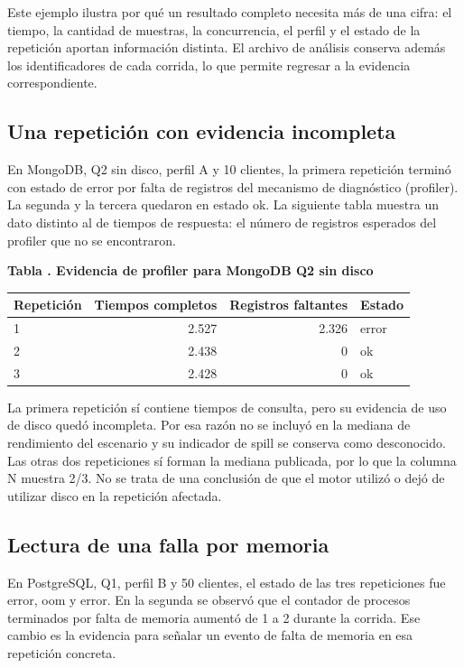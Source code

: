 \documentclass[12pt,letterpaper]{article}
\begin{document}
Este ejemplo ilustra por qué un resultado completo necesita más de una cifra: el tiempo, la cantidad de muestras, la concurrencia, el perfil y el estado de la repetición aportan información distinta. El archivo de análisis conserva además los identificadores de cada corrida, lo que permite regresar a la evidencia correspondiente.

\subsection*{Una repetición con evidencia incompleta}
En MongoDB, Q2 sin disco, perfil A y 10 clientes, la primera repetición terminó con estado de error por falta de registros del mecanismo de diagnóstico (profiler). La segunda y la tercera quedaron en estado ok. La siguiente tabla muestra un dato distinto al de tiempos de respuesta: el número de registros esperados del profiler que no se encontraron.

\par\begin{minipage}{\textwidth}\begin{center}\textbf{Tabla \thetable. Evidencia de profiler para MongoDB Q2 sin disco}\par\small
\begin{tabular}{lrrl}\toprule Repetición & Tiempos completos & Registros faltantes & Estado \\ \midrule
1 & 2.527 & 2.326 & error \\
2 & 2.438 & 0 & ok \\
3 & 2.428 & 0 & ok \\
\bottomrule\end{tabular}\end{center}\end{minipage}\par

La primera repetición sí contiene tiempos de consulta, pero su evidencia de uso de disco quedó incompleta. Por esa razón no se incluyó en la mediana de rendimiento del escenario y su indicador de spill se conserva como desconocido. Las otras dos repeticiones sí forman la mediana publicada, por lo que la columna N muestra 2/3. No se trata de una conclusión de que el motor utilizó o dejó de utilizar disco en la repetición afectada.

\subsection*{Lectura de una falla por memoria}
En PostgreSQL, Q1, perfil B y 50 clientes, el estado de las tres repeticiones fue error, oom y error. En la segunda se observó que el contador de procesos terminados por falta de memoria aumentó de 1 a 2 durante la corrida. Ese cambio es la evidencia para señalar un evento de falta de memoria en esa repetición concreta.
\end{document}
